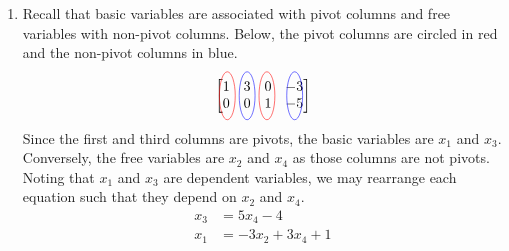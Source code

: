 \begin{SaveQuestion}
\begin{enumerate}
        \item Recall that basic variables are associated with pivot columns and free variables with non-pivot columns. Below, the pivot columns are circled in red and the non-pivot columns in blue. 
        $$
        \begin{tikzpicture}
        \draw (0,0) node{$\begin{bmatrix} 1 & 3 & 0 & -3 \\ 0 & 0 & 1 & -5\end{bmatrix}$};
        \draw[red] (-0.9,0) ellipse (0.2cm and 0.6cm);
        \draw[blue] (-0.4,0) ellipse (0.2cm and 0.6cm);
        \draw[red] (0.1,0) ellipse (0.2cm and 0.6cm);
        \draw[blue] (0.8,0) ellipse (0.2cm and 0.6cm);
        \end{tikzpicture}
        $$
        Since the first and third columns are pivots, the basic variables are $x_1$ and $x_3$. Conversely, the free variables are $x_2$ and $x_4$ as those columns are not pivots. Noting that $x_1$ and $x_3$ are dependent variables, we may rearrange each equation such that they depend on $x_2$ and $x_4$. 
        \begin{align*}
            x_3     &= 5x_4 - 4 \\
            x_1     &= -3x_2 + 3x_4 + 1
        \end{align*}
        

\end{enumerate}
\end{SaveQuestion}
